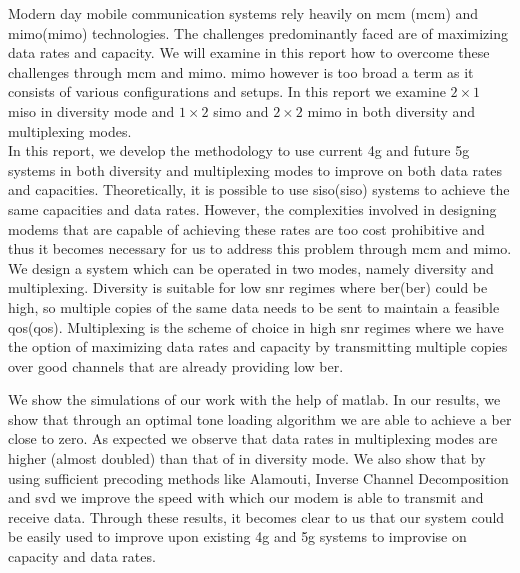 \vspace{-1cm}



Modern day mobile communication systems rely heavily on \acrlong{mcm} (\acrshort{mcm}) and \acrlong{mimo}(\acrshort{mimo}) technologies. The challenges predominantly faced are of maximizing data rates and capacity. We will examine in this report how to overcome these challenges through \acrshort{mcm} and \acrshort{mimo}. \acrshort{mimo} however is too broad a term as it consists of various configurations and setups. In this report we examine $2 \times 1$ \acrshort{miso} in diversity mode and $1 \times 2$ \acrshort{simo} and $2 \times 2$ \acrshort{mimo} in both diversity and multiplexing modes.\\




In this report, we develop the methodology to use current \acrshort{4g} and future \acrshort{5g} systems in both diversity and multiplexing modes to improve on both data rates and capacities. Theoretically, it is possible to use \acrlong{siso}(\acrshort{siso}) systems to achieve the same capacities and data rates. However, the complexities involved in designing \gls{modems} that are capable of achieving these rates are too cost prohibitive and thus it becomes necessary for us to address this problem through \acrshort{mcm} and \acrshort{mimo}.\\

We design a system which can be operated in two modes, namely diversity and multiplexing. Diversity is suitable for low \acrshort{snr} regimes where \acrlong{ber}(\acrshort{ber}) could be high, so multiple copies of the same data needs to be sent to maintain a feasible \acrlong{qos}(\acrshort{qos}). Multiplexing is the scheme of choice in high \acrshort{snr} regimes where we have the option of maximizing data rates and capacity by transmitting multiple copies over good channels that are already providing low \acrshort{ber}.


We show the simulations of our work with the help of \gls{matlab}. In our results, we show that through an optimal tone loading algorithm we are able to achieve a \acrshort{ber} close to zero. As expected we observe that data rates in multiplexing modes are higher (almost doubled) than that of in diversity mode. We also show that by  using sufficient precoding methods like Alamouti, Inverse Channel Decomposition and \acrshort{svd} we improve the speed with which our modem is able to transmit and receive data. Through these results, it becomes clear to us that our system could be easily used to improve upon existing \acrshort{4g} and \acrshort{5g} systems to improvise on capacity and data rates.


\pagebreak